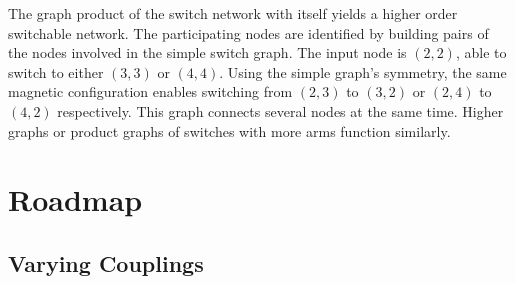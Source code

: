 \begin{center}
\end{center}

\noindent The graph product of the switch network with itself yields a higher order switchable network. The participating nodes are identified by building pairs of the nodes involved in the simple switch graph. The input node is $(2,2)$, able to switch to either $(3,3)$ or $(4,4)$. Using the simple graph's symmetry, the same magnetic configuration enables switching from $(2,3)$ to $(3,2)$ or $(2,4)$ to $(4,2)$ respectively. This graph connects several nodes at the same time. Higher graphs or product graphs of switches with more arms function similarly.

\section{Roadmap}
\subsection{Varying Couplings}

